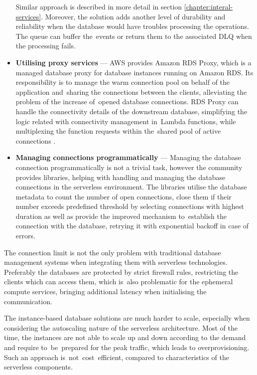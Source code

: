 \begin{itemize}
   Similar approach is described in more detail in section \ref{chapter:interal-services}.
   Moreover, the solution adds another level of durability and reliability when the database would have troubles processing the operations.
   The queue can buffer the~events or return them to the associated DLQ when the processing fails.
   \item \textbf{Utilising proxy services} ---
   AWS provides Amazon RDS Proxy, which is a managed database proxy for database instances running on Amazon RDS.
   Its responsibility is to manage the warm connection pool on behalf of the application and~sharing the connections between the clients, alleviating the problem of the increase of~opened database connections.
   RDS Proxy can handle the connectivity details of the downstream database, simplifying the logic related with connectivity management in~Lambda functions, while multiplexing the function requests within the~shared pool of active connections \cite{UsingRelationalDatabasesWithAWSLambdaEasyConnectionPooling}.
   \item \textbf{Managing connections programmatically} ---
   Managing the database connection programmatically is not a trivial task, however the community provides libraries, helping with handling and managing the database connections in the serverless environment.
   The libraries utilise the database metadata to count the number of open connections, close them if their number exceeds predefined threshold by selecting connections with highest duration as well as provide the improved mechanism to~establish the connection with the database, retrying it with exponential backoff in case of errors.
\end{itemize}

The connection limit is not the only problem with traditional database management systems when integrating them with serverless technologies.
Preferably the databases are protected by strict firewall rules, restricting the clients which can access them, which is~also problematic for the ephemeral compute services, bringing additional latency when initialising the communication.

The instance-based database solutions are much harder to scale, especially when considering the autoscaling nature of the serverless architecture.
Most of the time, the instances are not able to scale up and down according to the demand and require to~be~prepared for the peak traffic, which leads to overprovisioning.
Such an approach is~not~cost~efficient, compared to characteristics of the serverless components.

